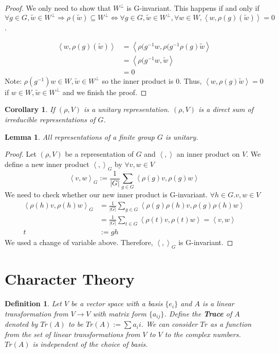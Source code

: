 \documentclass[letterpaper, leqno, 12pt]{article}
\providecommand{\abs}[1]{\left\lvert#1\right\rvert}
\providecommand{\ip}[1]{\left\langle #1 \right\rangle}
\newcommand {\repV} {(\rho,V)}
\theoremstyle{stdthm}
\newtheorem{lem}[thm]{Lemma}
\newtheorem{cor}[thm]{Corollary}
\theoremstyle{stddef}
\newtheorem{defn}[thm]{Definition}
\theoremstyle{stdnonum}
\theoremstyle{stdqands}
\theoremstyle{stdbold}
\begin{document}
\begin{proof}
We only need to show that $W^{\perp}$ is G-invariant. This happens if and only if $\forall g\in G, \tilde{w} \in W^{\perp} \Rightarrow \rho(\tilde{w}) \subseteq W^{\perp} \Leftrightarrow \forall g \in G, \tilde{w} \in W^\perp,\forall w \in W, \ip{w,\rho(g)(\tilde{w})} = 0$. 

\begin{align*}
\ip{w,\rho(g)(\tilde{w})} &= \ip{\rho(g^{-1}w, \rho(g^{-1}\rho(g)\tilde{w}}\\
&= \ip{\rho(g^{-1}w, \tilde{w}}\\
&= 0
\end{align*}
Note:  $\rho(g^{-1})w \in W, \tilde{w} \in W^{\perp}$ so the inner product is 0. Thus, $\ip{w, \rho(g)\tilde{w}} = 0$ if $w \in W, \tilde{w} \in W^\perp$ and we finish the proof. 
\end{proof}

\begin{cor}
If $\repV$ is a unitary representation. $\repV$ is a direct sum of irreducible representations of $G$. 
\end{cor}

\begin{lem}
All representations of a finite group $G$ is unitary. 
\end{lem}

\begin{proof}
Let $\repV$ be a representation of $G$ and $\ip{,}$ an inner product on $V$. We define a new inner product $\ip{,}_G$ by $\forall v,w\in V$
\[ \ip{v,w}_G := \frac{1}{\abs{G}} \sum_{g\in G} \ip{\rho(g)v, \rho(g)w}\]
We need to check whether our new inner product is G-invariant. $\forall h \in G. v,w \in V$
\begin{align*}
\ip{\rho(h)v,\rho(h)w}_G &= \frac{1}{\abs{G}} \sum_{g\in G} \ip{\rho(g)\rho(h)v, \rho(g)\rho(h)w}\\
&= \frac{1}{\abs{G}} \sum_{t \in G} \ip{\rho(t)v, \rho(t)w} = \ip{v,w}\\
t&:= gh
\end{align*}
We used a change of variable above. Therefore, $\ip{,}_G$ is G-invariant. 
\end{proof}

\newpage
\section{Character Theory}

\begin{defn}
Let $V$ be a vector space with a basis $\{e_i\}$ and $A$ is a linear transformation from $V \rightarrow V$ with matrix form $\{a_{ij}\}$. Define the {\bf Trace} of $A$ denoted by $Tr(A)$ to be $Tr(A):= \sum a_ii$. We can consider $Tr$ as a function from the set of linear transformations from $V$ to $V$ to the complex numbers.  $Tr(A)$ is independent of the choice of basis. 
\end{defn}
\end{document}
